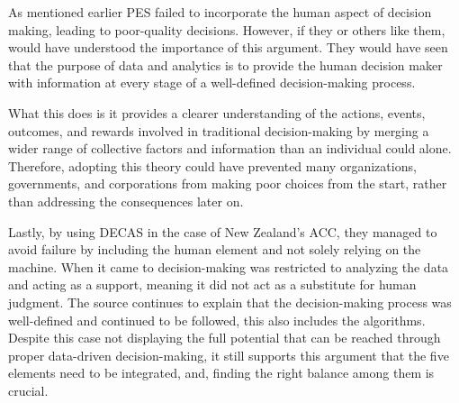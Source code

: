As mentioned earlier PES failed to incorporate the human aspect of decision making, leading to poor-quality decisions. However, if they or others like them, would have understood the importance of this argument. They would have seen that the purpose of data and analytics is to provide the human decision maker with information at every stage of a well-defined decision-making process.

What this does is it provides a clearer understanding of the actions, events, outcomes, and rewards involved in traditional decision-making by merging a wider range of collective factors and information than an individual could alone. Therefore, adopting this theory could have prevented many organizations, governments, and corporations from making poor choices from the start, rather than addressing the consequences later on.


Lastly, by using DECAS in the case of New Zealand’s ACC, they managed to avoid failure by including the human element and not solely relying on the machine. When it came to decision-making was restricted to analyzing the data and acting as a support, meaning it did not act as a substitute for human judgment. The source continues to explain that the decision-making process was well-defined and continued to be followed, this also includes the algorithms. Despite this case not displaying the full potential that can be reached through proper data-driven decision-making, it still supports this argument that the five elements need to be integrated, and, finding the right balance among them is crucial.